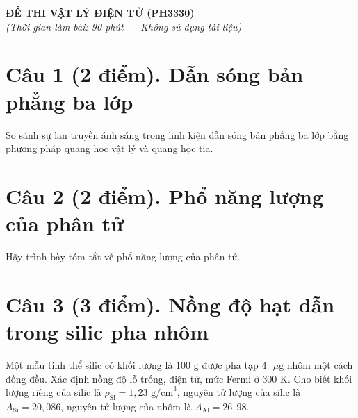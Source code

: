 \documentclass[11pt,a4paper]{article}
\begin{document}
\begin{center}
    {\Large\bfseries ĐỀ THI VẬT LÝ ĐIỆN TỬ (PH3330)}\\[0.2cm]
    \textit{(Thời gian làm bài: 90 phút --- Không sử dụng tài liệu)}
\end{center}
\vspace{0.2cm}

\section*{Câu 1 (2 điểm). Dẫn sóng bản phẳng ba lớp}

So sánh sự lan truyền ánh sáng trong linh kiện dẫn sóng bản phẳng ba lớp bằng phương pháp quang học vật lý và quang học tia.

\vspace{0.5cm}

\section*{Câu 2 (2 điểm). Phổ năng lượng của phân tử}

Hãy trình bày tóm tắt về phổ năng lượng của phân tử.

\vspace{0.5cm}

\section*{Câu 3 (3 điểm). Nồng độ hạt dẫn trong silic pha nhôm}

Một mẫu tinh thể silic có khối lượng là $100\text{ g}$ được pha tạp $4\text{ }\mu\text{g}$ nhôm một cách đồng đều. Xác định nồng độ lỗ trống, điện tử, mức Fermi ở $300\text{ K}$. Cho biết khối lượng riêng của silic là $\rho_{\text{Si}} = 1{,}23\text{ g/cm}^3$, nguyên tử lượng của silic là $A_{\text{Si}} = 20{,}086$, nguyên tử lượng của nhôm là $A_{\text{Al}} = 26{,}98$.

\vspace{0.5cm}

\end{document}
